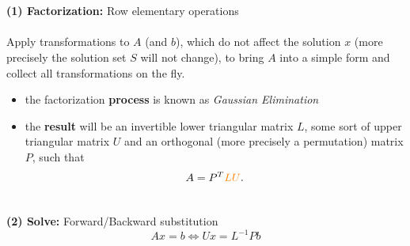 \begin{frame}[c]
	\hspace*{1.5cm}	
\end{frame}	
\begin{frame}
	
	~\\~\\
		\textbf{(1) Factorization:} Row elementary operations \\~\\
		Apply transformations to $A$ (and $b$), which do not affect the solution $x$ (more precisely the solution set $S$ will not change), to bring $A$ into a simple form and collect all transformations on the fly.\\ 
	\begin{itemize}
		\vspace{0.3cm}\item the factorization \textbf{process} is known as \textit{Gaussian Elimination}
		\vspace{0.3cm}\item the \textbf{result} will be an invertible lower triangular matrix $L$, some sort of upper triangular matrix $U$ and an orthogonal (more precisely a permutation) matrix $P$, such that
		$$ A = P^T{\color{orange}LU}. $$ 	     
	\end{itemize}
		~\\
\textbf{(2) Solve:} Forward/Backward substitution \\
$$Ax = b \Leftrightarrow  Ux = L^{-1}Pb $$
\end{frame}

